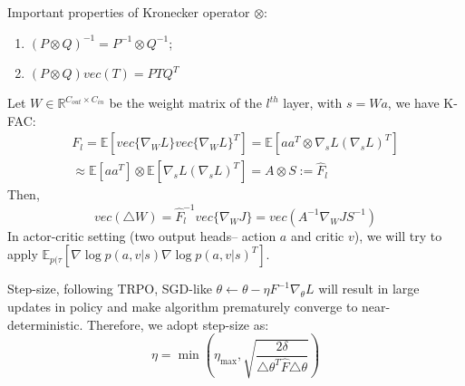 \documentclass{article}
\begin{document}
Important properties of Kronecker operator $\otimes$:
\begin{enumerate}
\item $(P\otimes Q)^{-1}=P^{-1}\otimes Q^{-1}$;
\item $(P\otimes Q)vec(T)=PTQ^T$
\end{enumerate}

Let $W\in \mathbb{R}^{C_{out}\times C_{in}}$ be the weight matrix of the $l^{th}$ layer, with $s=Wa$, we have K-FAC:
\begin{eqnarray}
F_l=\mathbb{E}[vec\{\nabla_WL\}vec\{\nabla_WL\}^T]=\mathbb{E}[aa^T\otimes \nabla_sL(\nabla_sL)^T]\\
\approx \mathbb{E}[aa^T]\otimes \mathbb{E}[\nabla_sL(\nabla_sL)^T]=A\otimes S:=\hat{F}_l
\end{eqnarray}
Then, 
\begin{equation}
vec(\triangle W)=\hat{F}_l^{-1}vec\{\nabla_WJ\}=vec(A^{-1}\nabla_WJS^{-1})
\end{equation}
In actor-critic setting (two output heads-- action $a$ and critic $v$), we will try to apply $\mathbb{E}_{p(\tau}[\nabla\log p(a,v|s)\nabla\log p(a,v|s)^T]$.

Step-size, following TRPO, SGD-like $\theta \leftarrow \theta-\eta F^{-1}\nabla_{\theta}L$ will result in large updates in policy and make algorithm prematurely converge to near-deterministic. Therefore, we adopt step-size as:
\begin{equation}
\eta=\min(\eta_{\max},\sqrt{\frac{2\delta}{\triangle\theta^T\hat{F}\triangle\theta}})
\end{equation}
\end{document}
